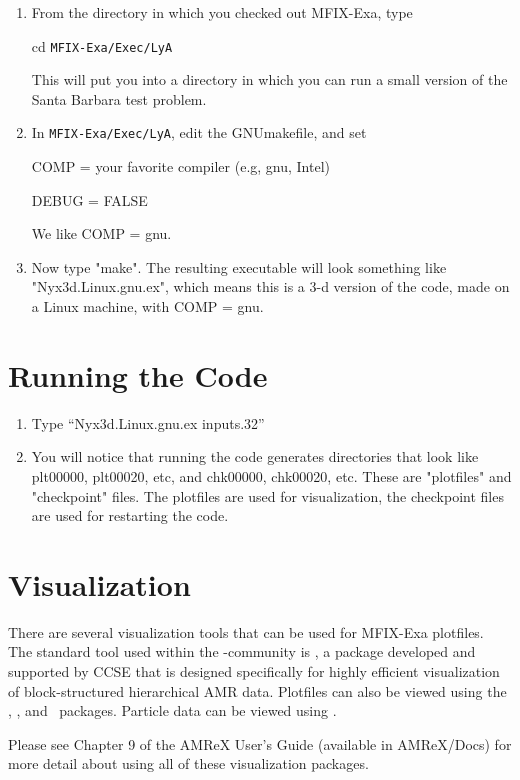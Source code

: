 \begin{enumerate}

\item From the directory in which you checked out MFIX-Exa, type

cd {\tt MFIX-Exa/Exec/LyA}

This will put you into a directory in which you can run a small
version of the Santa Barbara test problem.

\item In {\tt MFIX-Exa/Exec/LyA}, edit the GNUmakefile, and set

COMP = your favorite compiler (e.g, gnu, Intel)

DEBUG = FALSE

We like COMP = gnu.

\item Now type "make". The resulting executable will look something like 
"Nyx3d.Linux.gnu.ex", which means this is a 3-d version of the code, 
made on a Linux machine, with COMP = gnu.

\end{enumerate}

\section{Running the Code}

\begin{enumerate}

\item Type ``Nyx3d.Linux.gnu.ex inputs.32''

\item You will notice that running the code generates directories that look like 
plt00000, plt00020, etc, and chk00000, chk00020, etc. These are "plotfiles" and 
"checkpoint" files. The plotfiles are used for visualization, the checkpoint files are 
used for restarting the code.

\end{enumerate}

\section{Visualization}

There are several visualization tools that can be used for MFIX-Exa
plotfiles.  The standard tool used within the
\amrex-community is \amrvis, a package developed and supported
by CCSE that is designed specifically for highly efficient visualization
of block-structured hierarchical AMR data.
Plotfiles can also be viewed using the \visit, \paraview, and \yt\ packages.
Particle data can be viewed using \paraview.

Please see Chapter 9 of the AMReX User's Guide (available in AMReX/Docs)
for more detail about using all of these visualization packages.
